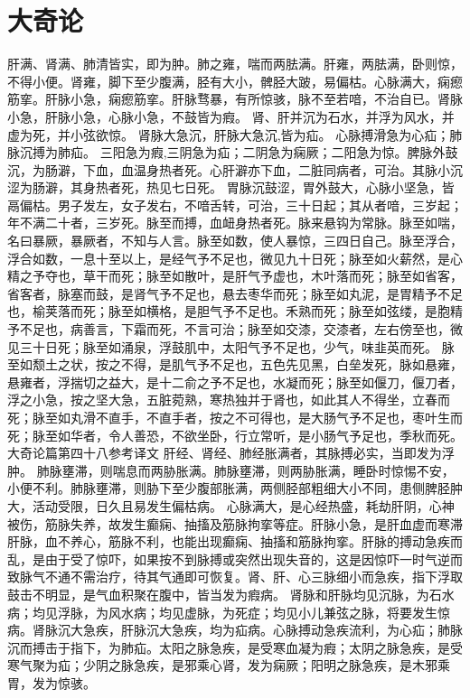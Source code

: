 \documentclass[a4paper,12pt,UTF8,twoside]{ctexbook}
\begin{document}
\chapter{大奇论}
肝满、肾满、肺清皆实，即为肿。肺之雍，喘而两胠满。肝雍，两胠满，卧则惊，不得小便。肾雍，脚下至少腹满，胫有大小，髀胫大跛，易偏枯。心脉满大，痫瘛筋挛。肝脉小急，痫瘛筋挛。肝脉骛暴，有所惊骇，脉不至若喑，不治自已。肾脉小急，肝脉小急，心脉小急，不鼓皆为瘕。
肾、肝并沉为石水，并浮为风水，并虚为死，并小弦欲惊。
肾脉大急沉，肝脉大急沉,皆为疝。
心脉搏滑急为心疝；肺脉沉搏为肺疝。
三阳急为瘕,三阴急为疝；二阴急为痫厥；二阳急为惊。脾脉外鼓沉，为肠澼，下血，血温身热者死。心肝澼亦下血，二脏同病者，可治。其脉小沉涩为肠澼，其身热者死，热见七日死。
胃脉沉鼓涩，胃外鼓大，心脉小坚急，皆鬲偏枯。男子发左，女子发右，不喑舌转，可治，三十日起；其从者喑，三岁起；年不满二十者，三岁死。脉至而搏，血衄身热者死。脉来悬钩为常脉。脉至如喘，名曰暴厥，暴厥者，不知与人言。脉至如数，使人暴惊，三四日自己。脉至浮合，浮合如数，一息十至以上，是经气予不足也，微见九十日死；脉至如火薪然，是心精之予夺也，草干而死；脉至如散叶，是肝气予虚也，木叶落而死；脉至如省客，省客者，脉塞而鼓，是肾气予不足也，悬去枣华而死；脉至如丸泥，是胃精予不足也，榆荚落而死；脉至如横格，是胆气予不足也。禾熟而死；脉至如弦缕，是胞精予不足也，病善言，下霜而死，不言可治；脉至如交漆，交漆者，左右傍至也，微见三十日死；脉至如涌泉，浮鼓肌中，太阳气予不足也，少气，味韭英而死。
脉至如颓土之状，按之不得，是肌气予不足也，五色先见黑，白垒发死，脉如悬雍，悬雍者，浮揣切之益大，是十二俞之予不足也，水凝而死；脉至如偃刀，偃刀者，浮之小急，按之坚大急，五脏菀熟，寒热独并于肾也，如此其人不得坐，立春而死；脉至如丸滑不直手，不直手者，按之不可得也，是大肠气予不足也，枣叶生而死；脉至如华者，令人善恐，不欲坐卧，行立常听，是小肠气予足也，季秋而死。
大奇论篇第四十八参考译文
肝经、肾经、肺经胀满者，其脉搏必实，当即发为浮肿。
肺脉壅滞，则喘息而两胁胀满。肺脉壅滞，则两胁胀满，睡卧时惊惕不安，小便不利。肺脉壅滞，则胁下至少腹部胀满，两侧胫部粗细大小不同，患侧脾胫肿大，活动受限，日久且易发生偏枯病。
心脉满大，是心经热盛，耗劫肝阴，心神被伤，筋脉失养，故发生癫痫、抽搐及筋脉拘挛等症。肝脉小急，是肝血虚而寒滞肝脉，血不养心，筋脉不利，也能出现癫痫、抽搐和筋脉拘挛。肝脉的搏动急疾而乱，是由于受了惊吓，如果按不到脉搏或突然出现失音的，这是因惊吓一时气逆而致脉气不通不需治疗，待其气通即可恢复。肾、肝、心三脉细小而急疾，指下浮取鼓击不明显，是气血积聚在腹中，皆当发为瘕病。
肾脉和肝脉均见沉脉，为石水病；均见浮脉，为风水病；均见虚脉，为死症；均见小儿兼弦之脉，将要发生惊病。肾脉沉大急疾，肝脉沉大急疾，均为疝病。心脉搏动急疾流利，为心疝；肺脉沉而搏击于指下，为肺疝。太阳之脉急疾，是受寒血凝为瘕；太阴之脉急疾，是受寒气聚为疝；少阴之脉急疾，是邪乘心肾，发为痫厥；阳明之脉急疾，是木邪乘胃，发为惊骇。
\end{document}

